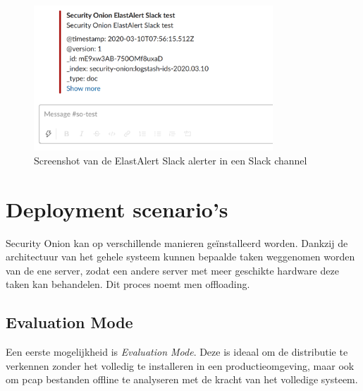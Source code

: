\documentclass[a4paper,12pt]{report}
\begin{document}
\begin{figure}[H]
  \centering
  \includegraphics[width=0.8\textwidth]{elastalert-slack}
  \caption{Screenshot van de ElastAlert Slack alerter in een Slack channel}
  \label{fig:elastalert-slack}
\end{figure}

\section{Deployment scenario's}
Security Onion kan op verschillende manieren geïnstalleerd worden.
Dankzij de architectuur van het gehele systeem kunnen bepaalde taken weggenomen worden van de ene server, zodat een andere server met meer geschikte hardware deze taken kan behandelen.
Dit proces noemt men offloading.

\subsection{Evaluation Mode}
Een eerste mogelijkheid is \emph{Evaluation Mode}.
Deze is ideaal om de distributie te verkennen zonder het volledig te installeren in een productieomgeving, maar ook om pcap bestanden offline te analyseren met de kracht van het volledige systeem.
\end{document}
